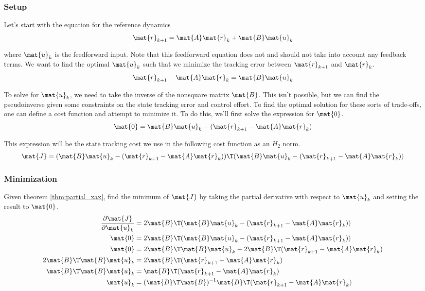 \subsubsection{Setup}

Let's start with the equation for the \gls{reference} dynamics
\begin{equation*}
  \mat{r}_{k+1} = \mat{A}\mat{r}_k + \mat{B}\mat{u}_k
\end{equation*}

where $\mat{u}_k$ is the feedforward input. Note that this feedforward equation
does not and should not take into account any feedback terms. We want to find
the optimal $\mat{u}_k$ such that we minimize the \gls{tracking} error between
$\mat{r}_{k+1}$ and $\mat{r}_k$.
\begin{equation*}
  \mat{r}_{k+1} - \mat{A}\mat{r}_k = \mat{B}\mat{u}_k
\end{equation*}

To solve for $\mat{u}_k$, we need to take the inverse of the nonsquare matrix
$\mat{B}$. This isn't possible, but we can find the pseudoinverse given some
constraints on the \gls{state} \gls{tracking} error and \gls{control effort}. To
find the optimal solution for these sorts of trade-offs, one can define a cost
function and attempt to minimize it. To do this, we'll first solve the
expression for $\mat{0}$.
\begin{equation*}
  \mat{0} = \mat{B}\mat{u}_k - (\mat{r}_{k+1} - \mat{A}\mat{r}_k)
\end{equation*}

This expression will be the \gls{state} \gls{tracking} cost we use in the
following cost function as an $H_2$ norm.
\begin{equation*}
  \mat{J} = (\mat{B}\mat{u}_k - (\mat{r}_{k+1} - \mat{A}\mat{r}_k))\T
    (\mat{B}\mat{u}_k - (\mat{r}_{k+1} - \mat{A}\mat{r}_k))
\end{equation*}

\subsubsection{Minimization}

Given theorem \ref{thm:partial_xax}, find the minimum of $\mat{J}$ by taking the
partial derivative with respect to $\mat{u}_k$ and setting the result to
$\mat{0}$.
\begin{align*}
  \frac{\partial\mat{J}}{\partial\mat{u}_k} &= 2\mat{B}\T
    (\mat{B}\mat{u}_k - (\mat{r}_{k+1} - \mat{A}\mat{r}_k)) \\
  \mat{0} &= 2\mat{B}\T
    (\mat{B}\mat{u}_k - (\mat{r}_{k+1} - \mat{A}\mat{r}_k)) \\
  \mat{0} &= 2\mat{B}\T\mat{B}\mat{u}_k -
    2\mat{B}\T(\mat{r}_{k+1} - \mat{A}\mat{r}_k) \\
  2\mat{B}\T\mat{B}\mat{u}_k &=
    2\mat{B}\T(\mat{r}_{k+1} - \mat{A}\mat{r}_k) \\
  \mat{B}\T\mat{B}\mat{u}_k &=
    \mat{B}\T(\mat{r}_{k+1} - \mat{A}\mat{r}_k) \\
  \mat{u}_k &=
    (\mat{B}\T\mat{B})^{-1} \mat{B}\T(\mat{r}_{k+1} - \mat{A}\mat{r}_k)
\end{align*}

